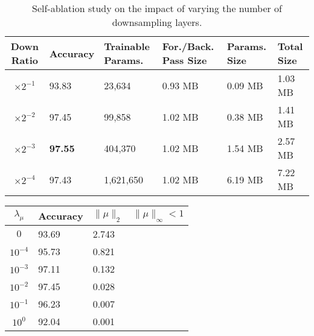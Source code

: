 \begin{table}[!h]
\centering
\begin{tabular}{c|DDDDD}
\toprule
Down Ratio& Accuracy  & Trainable Params. & For./Back. Pass Size  & Params. Size  & Total Size\\\hline
$\times 2^{-1}$ & 93.83     & 23,634            & 0.93 MB               & 0.09 MB       & 1.03 MB\\ 
$\times 2^{-2}$ & 97.45     & 99,858            & 1.02 MB               & 0.38 MB       & 1.41 MB\\ 
$\times 2^{-3}$ & \bf 97.55     & 404,370           & 1.02 MB               & 1.54 MB       & 2.57 MB\\ 
$\times 2^{-4}$ & 97.43     & 1,621,650         & 1.02 MB               & 6.19 MB       & 7.22 MB\\ 
\bottomrule
\end{tabular}
\caption{Self-ablation study on the impact of varying the number of downsampling layers.}
\label{tb:convdepth}
\end{table}


\begin{table}
\small
\centering
\begin{tabular}{c|DDD}
\toprule
$\lambda_\mu$   & Accuracy  & $\|\mu\|_2$   & $\|\mu\|_\infty < 1$  \\\hline
$ 0 $           & 93.69     & 2.743         &                 \\
$10^{-4}$       & 95.73     & 0.821         &                 \\
$10^{-3}$       & 97.11     & 0.132         &                 \\
$10^{-2}$       & 97.45     & 0.028         &                 \\
$10^{-1}$       & 96.23     & 0.007         &                 \\
$10^{ 0}$       & 92.04     & 0.001         &                 \\\hline
\bottomrule
\end{tabular}
\label{tb:self}
\end{table}